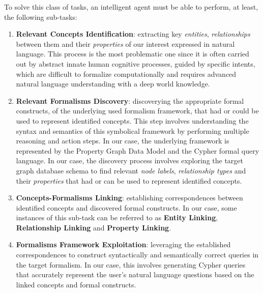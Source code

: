 To solve this class of tasks, an intelligent agent must be able to perform, at least, the following sub-tasks:
\begin{enumerate}
    \item \label{itm:identify} \textbf{Relevant Concepts Identification}: extracting key \textit{entities}, \textit{relationships} between them and their \textit{properties} of our interest expressed in natural language. This process is the most problematic one since it is often carried out by abstract innate human cognitive processes, guided by specific intents, which are difficult to formalize computationally and requires advanced natural language understanding with a deep world knowledge.

    \item \label{itm:discovery} \textbf{Relevant Formalisms Discovery}: discoverying the appropriate formal constructs, of the underlying used formalism framework, that had or could be used to represent identified concepts. This step involves understanding the syntax and semantics of this symbolical framework by performing multiple reasoning and action steps. In our case, the underlying framework is represented by the Property Graph Data Model and the Cypher formal query language. In our case, the discovery process involves exploring the target graph database schema to find relevant \textit{node labels}, \textit{relationship types} and their \textit{properties} that had or can be used to represent identified concepts.

    \item \label{itm:linking} \textbf{Concepts-Formalisms Linking}: establishing correspondences between identified concepts and discovered formal constructs. In our case, some instances of this sub-task can be referred to as \textbf{Entity Linking}, \textbf{Relationship Linking} and \textbf{Property Linking}.
    
    \item \label{itm:representing} \textbf{Formalisms Framework Exploitation}: leveraging the established correspondences to construct syntactically and semantically correct queries in the target formalism. In our case, this involves generating Cypher queries that accurately represent the user's natural language questions based on the linked concepts and formal constructs.
\end{enumerate}

